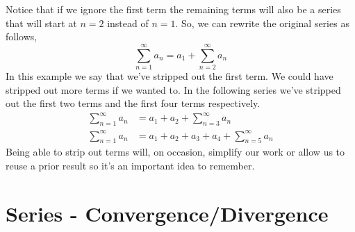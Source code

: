 \documentclass[10pt,reqno]{book}
\theoremstyle{definition}
\begin{document}
	Notice that if we ignore the first term the remaining terms will also be a series that will start at $ n=2 $ instead of $ n=1 $. So, we can rewrite the original series as follows,
	\[ \sum\limits_{n=1}^{\infty} a_n = a_1 + \sum\limits_{n=2}^{\infty} a_n  \]
	In this example we say that we’ve stripped out the first term. We could have stripped out more terms if we wanted to. In the following series we've stripped out the first two terms and the first four terms respectively.
	\begin{align*}
		\sum\limits_{n=1}^{\infty} a_n &= a_1 + a_2 + \sum\limits_{n=3}^{\infty} a_n\\
		\sum\limits_{n=1}^{\infty} a_n &= a_1 + a_2 + a_3 + a_4 + \sum\limits_{n=5}^{\infty} a_n
	\end{align*}
	Being able to strip out terms will, on occasion, simplify our work or allow us to reuse a prior result so it's an important idea to remember.

	\section{Series - Convergence/Divergence}
	
\end{document}
